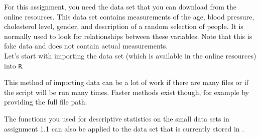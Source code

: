 \setcounter{chapter}{1}
\setcounter{section}{3}
\setcounter{question}{0}



For this assignment, you need the  data set that you can download from the online resources. This data set contains measurements of the age, blood pressure, cholesterol level, gender, and description of a random selection of people. It is normally used to look for relationships between these variables. Note that this is fake data and does not contain actual measurements. \\

Let’s start with importing the data set (which is available in the online resources) into \texttt{R}. \\


\twolineanswerbox

This method of importing data can be a lot of work if there are many files or if the script will be run many times. Faster methods exist though, for example by providing the full file path. \\



\twolineanswerbox 

The functions you used for descriptive statistics on the small data sets in assignment 1.1 can also be applied to the data set that is currently stored in . \\


